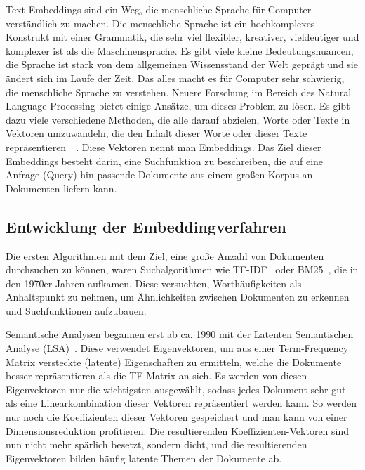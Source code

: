 Text Embeddings sind ein Weg, die menschliche Sprache für Computer verständlich zu machen.
Die menschliche Sprache ist ein hochkomplexes Konstrukt mit einer Grammatik, die sehr viel flexibler, kreativer, vieldeutiger und komplexer ist als die Maschinensprache.
Es gibt viele kleine Bedeutungsnuancen, die Sprache ist stark von dem allgemeinen Wissensstand der Welt geprägt und sie ändert sich im Laufe der Zeit.
Das alles macht es für Computer sehr schwierig, die menschliche Sprache zu verstehen.
Neuere Forschung im Bereich des Natural Language Processing bietet einige Ansätze, um dieses Problem zu lösen.
Es gibt dazu viele verschiedene Methoden, die alle darauf abzielen, Worte oder Texte in Vektoren umzuwandeln, die den Inhalt dieser Worte oder dieser Texte repräsentieren~\cite{mikolov2013}~\cite{peters2018}.
Diese Vektoren nennt man Embeddings.
Das Ziel dieser Embeddings besteht darin, eine Suchfunktion zu beschreiben, die auf eine Anfrage (Query) hin passende Dokumente aus einem großen Korpus an Dokumenten liefern kann.

\subsection{Entwicklung der Embeddingverfahren}

Die ersten Algorithmen mit dem Ziel, eine große Anzahl von Dokumenten durchsuchen zu können, waren Suchalgorithmen wie TF-IDF~\cite{sparckjones1972} oder BM25~\cite{harman1995}, die in den 1970er Jahren aufkamen.
Diese versuchten, Worthäufigkeiten als Anhaltspunkt zu nehmen, um Ähnlichkeiten zwischen Dokumenten zu erkennen und Suchfunktionen aufzubauen.

Semantische Analysen begannen erst ab ca. 1990 mit der Latenten Semantischen Analyse (LSA)~\cite{landauer1997}.
Diese verwendet Eigenvektoren, um aus einer Term-Frequency Matrix versteckte (latente) Eigenschaften zu ermitteln, welche die Dokumente besser repräsentieren als die TF-Matrix an sich.
Es werden von diesen Eigenvektoren nur die wichtigsten ausgewählt, sodass jedes Dokument sehr gut als eine Linearkombination dieser Vektoren repräsentiert werden kann.
So werden nur noch die Koeffizienten dieser Vektoren gespeichert und man kann von einer Dimensionsreduktion profitieren.
Die resultierenden Koeffizienten-Vektoren sind nun nicht mehr spärlich besetzt, sondern dicht, und die resultierenden Eigenvektoren bilden häufig latente Themen der Dokumente ab.

